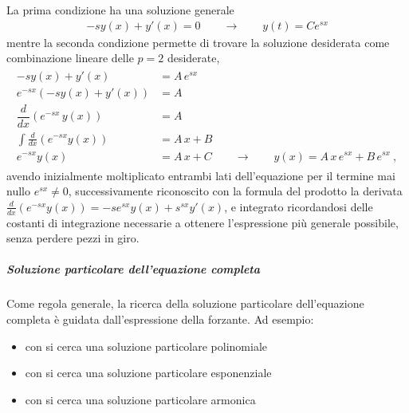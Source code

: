 \documentclass[letterpaper,10pt,italian]{jupyterBook}
\begin{document}
La prima condizione ha una soluzione generale
\begin{equation*}
\begin{split}- s y(x) + y'(x) = 0 \qquad \rightarrow \qquad y(t) = C e^{s x}\end{split}
\end{equation*}
\sphinxAtStartPar
mentre la seconda condizione permette di trovare la soluzione desiderata come combinazione lineare delle \(p=2\) desiderate,
\begin{equation*}
\begin{split}\begin{aligned}
  - s y(x) + y'(x) & = A \, e^{sx}  \\
  e^{-sx} \left( - s y(x) + y'(x) \right) & = A  \\
  \dfrac{d}{dx} \left( e^{-sx} \, y(x) \right) & = A  \\
  \int \frac{d}{dx} \left( e^{-sx} y(x) \right) & = A \, x + B \\
   e^{-sx} y(x) & = A \, x + C \qquad \rightarrow \qquad  y(x) = A \, x \, e^{sx} + B \, e^{sx}  \ ,
\end{aligned}\end{split}
\end{equation*}
\sphinxAtStartPar
avendo inizialmente moltiplicato entrambi lati dell’equazione per il termine mai nullo \(e^{sx} \ne 0\), successivamente riconoscito con la formula del prodotto la derivata \(\frac{d}{dx}\left( e^{-s x} y(x) \right) = - s e^{sx} y(x) + s^{sx} y'(x)\), e integrato ricordandosi delle costanti di integrazione necessarie a ottenere l’espressione più generale possibile, senza perdere pezzi in giro.


\subparagraph{Soluzione particolare dell’equazione completa}
\label{\detokenize{ch/ode:soluzione-particolare-dell-equazione-completa}}\label{\detokenize{ch/ode:ode-hs-types-linear-const-sol-part}}
\sphinxAtStartPar
Come regola generale, la ricerca della soluzione particolare dell’equazione completa è guidata dall’espressione della forzante. Ad esempio:
\begin{itemize}
\item {} 
\sphinxAtStartPar
con  si cerca una soluzione particolare polinomiale

\item {} 
\sphinxAtStartPar
con  si cerca una soluzione particolare esponenziale

\item {} 
\sphinxAtStartPar
con  si cerca una soluzione particolare armonica

\end{itemize}
\end{document}
